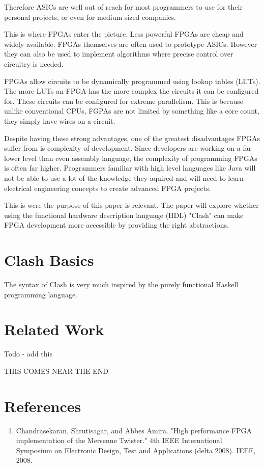 \documentclass{article}
\begin{document}
\begin{multicols}{2}
    Therefore ASICs are well out of reach for most programmers to use for their personal projects, or even for
    medium sized companies.

    This is where FPGAs enter the picture. Less powerful FPGAs are cheap and widely available. FPGAs themselves
    are often used to prototype ASICs. However they can also be used to implement algorithms where precise control
    over circuitry is needed.

    FPGAs allow circuits to be dynamically programmed using lookup tables (LUTs). The more LUTs an FPGA
    has the more complex the circuits it can be configured for. These circuits can be configured for
    extreme parallelism. This is because unlike conventional CPUs, FGPAs are not limited by something like a core count,
    they simply have wires on a circuit.

    Despite having these strong advantages, one of the greatest disadvantages FPGAs suffer from is complexity of development.
    Since developers are working on a far lower level than even assembly language, the complexity
    of programming FPGAs is often far higher. Programmers familiar with high level languages
    like Java will not be able to use a lot of the knowledge they aquired and will need to learn electrical engineering
    concepts to create advanced FPGA projects.

    This is were the purpose of this paper is relevant. The paper will explore whether using the
    functional hardware description language (HDL) "Clash" can make FPGA development more accessible by providing
    the right abstractions.    
    
    \section{Clash Basics}

    The syntax of Clash is very much inspired by the purely functional Haskell programming language.
    
    
    \section{Related Work}

    Todo - add this

    THIS COMES NEAR THE END

    
    \end{multicols}

    \break
    \section*{References}

    \begin{enumerate}

    \item Chandrasekaran, Shrutisagar, and Abbes Amira. "High performance FPGA implementation of the Mersenne Twister." 4th IEEE International Symposium on Electronic Design, Test and Applications (delta 2008). IEEE, 2008.

    \end{enumerate}
    
\end{document}
